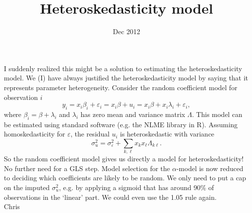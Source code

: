 \documentclass[11pt]{amsart}
\title{Heteroskedasticity model}
\author{}
\date{Dec 2012}                                           %
\begin{document}
\maketitle
\noindent I suddenly realized this might be a solution to estimating the heteroskedasticity model. We (I) have always justified the heteroskedasticity model by saying that it represents parameter heterogeneity. Consider the random coefficient model for observation $i$
\[
y_i=x_i\beta_i+\varepsilon_i=x_i\beta+u_i=x_i\beta + x_i\lambda_i + \varepsilon_i,
\]
where $\beta_i=\beta+\lambda_i$ and $\lambda_i$ has zero mean and variance matrix $\Lambda$. This model can be estimated using standard software (e.g. the NLME library in R). Assuming homoskedasticity for $\varepsilon$, the residual $u_i$ is heteroskedastic with variance
\[
\sigma^2_u=\sigma^2_\varepsilon+\sum_{k,\ell} x_k x_\ell \Lambda_{k\ell}.
\]
So the random coefficient model gives us directly a model for heteroskedasticity! No further need for a GLS step. Model selection for the $\alpha$-model is now reduced to deciding which coefficients are likely to be random. We only need to put a cap on the imputed $\sigma^2_u$, e.g. by applying a sigmoid that has around 90\% of observations in the `linear' part. We could even use the 1.05 rule again.\\[1cm]
Chris  
\end{document}
